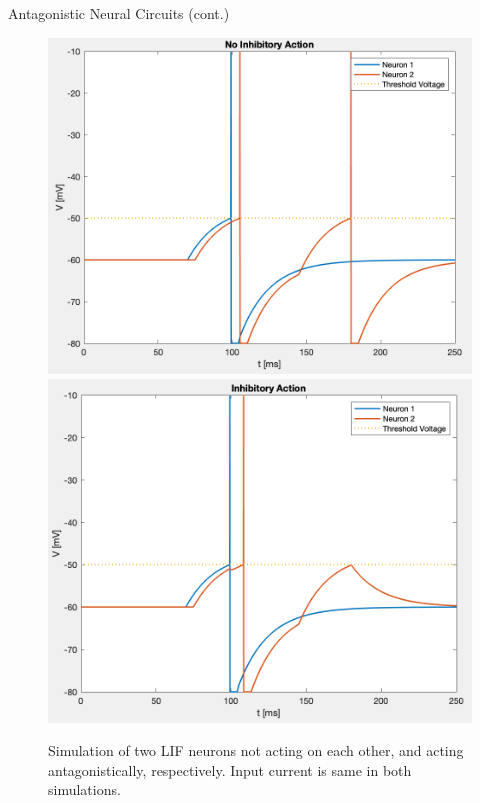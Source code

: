 \documentclass[leqno,presentation,unknownkeysallowed]{beamer}
\begin{document}
\begin{frame}{Antagonistic Neural Circuits (cont.)}
\begin{figure}
\center
\includegraphics[scale=0.29]{no_inhib.png}\hspace{1em}\includegraphics[scale=0.29]{inhib.png}
\caption{Simulation of two LIF neurons not acting on each other, and acting antagonistically, respectively. Input current is same in both simulations.}
\end{figure}
\end{frame}


\end{document}
